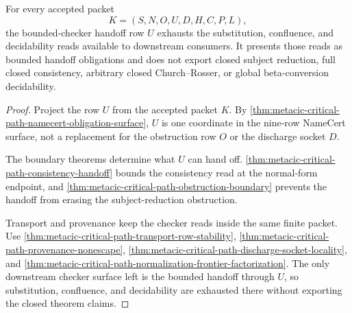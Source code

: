 \begin{theorem}
\label{thm:metacic-critical-path-bounded-checker-handoff-totality}
For every accepted packet
$$
K=(S,N,O,U,D,H,C,P,L),
$$
the bounded-checker handoff row $U$ exhausts the substitution, confluence, and decidability reads available to downstream consumers. It presents those reads as bounded handoff obligations and does not export closed subject reduction, full closed consistency, arbitrary closed Church--Rosser, or global beta-conversion decidability.
\end{theorem}
\begin{proof}
Project the row $U$ from the accepted packet $K$. By \autoref{thm:metacic-critical-path-namecert-obligation-surface}, $U$ is one coordinate in the nine-row NameCert surface, not a replacement for the obstruction row $O$ or the discharge socket $D$.

The boundary theorems determine what $U$ can hand off. \autoref{thm:metacic-critical-path-consistency-handoff} bounds the consistency read at the normal-form endpoint, and \autoref{thm:metacic-critical-path-obstruction-boundary} prevents the handoff from erasing the subject-reduction obstruction.

Transport and provenance keep the checker reads inside the same finite packet. Use \autoref{thm:metacic-critical-path-transport-row-stability}, \autoref{thm:metacic-critical-path-provenance-nonescape}, \autoref{thm:metacic-critical-path-discharge-socket-locality}, and \autoref{thm:metacic-critical-path-normalization-frontier-factorization}. The only downstream checker surface left is the bounded handoff through $U$, so substitution, confluence, and decidability are exhausted there without exporting the closed theorem claims.
\end{proof}

